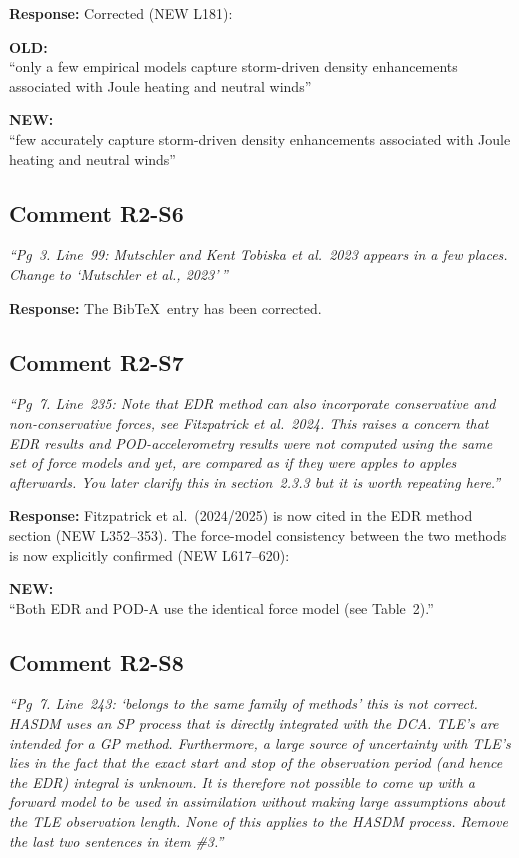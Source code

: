 \documentclass[11pt]{article}
\newcommand{\reviewercomment}[1]{%
  \medskip
  \noindent\textit{\color{reviewblue}#1}%
  \medskip
}
\newcommand{\oldtext}[1]{%
  \smallskip
  \noindent\hspace{1em}\begin{minipage}{0.92\textwidth}%
  \color{quotegray}\textbf{OLD:}\\[2pt]``#1''%
  \end{minipage}%
  \smallskip
}
\newcommand{\newtext}[1]{%
  \smallskip
  \noindent\hspace{1em}\begin{minipage}{0.92\textwidth}%
  \color{quotegreen}\textbf{NEW:}\\[2pt]``#1''%
  \end{minipage}%
  \smallskip
}
\begin{document}
\textbf{Response:}
Corrected (NEW L181):

\oldtext{only a few empirical models capture storm-driven density enhancements associated with Joule heating and neutral winds}

\newtext{few accurately capture storm-driven density enhancements associated with Joule heating and neutral winds}


\subsection{Comment R2-S6}

\reviewercomment{%
``Pg~3. Line~99: Mutschler and Kent Tobiska et al.\ 2023 appears in a few places. Change to `Mutschler et al., 2023'\,''}

\textbf{Response:}
The Bib\TeX\ entry has been corrected.


\subsection{Comment R2-S7}

\reviewercomment{%
``Pg~7. Line~235: Note that EDR method can also incorporate conservative and non-conservative forces, see Fitzpatrick et al.\ 2024. This raises a concern that EDR results and POD-accelerometry results were not computed using the same set of force models and yet, are compared as if they were apples to apples afterwards. You later clarify this in section~2.3.3 but it is worth repeating here.''}

\textbf{Response:}
Fitzpatrick et al.\ (2024/2025) is now cited in the EDR method section (NEW L352--353). The force-model consistency between the two methods is now explicitly confirmed (NEW L617--620):

\newtext{Both EDR and POD-A use the identical force model (see Table~2).}

\subsection{Comment R2-S8}

\reviewercomment{%
``Pg~7. Line~243: `belongs to the same family of methods' this is not correct. HASDM uses an SP process that is directly integrated with the DCA. TLE's are intended for a GP method. Furthermore, a large source of uncertainty with TLE's lies in the fact that the exact start and stop of the observation period (and hence the EDR) integral is unknown. It is therefore not possible to come up with a forward model to be used in assimilation without making large assumptions about the TLE observation length. None of this applies to the HASDM process. Remove the last two sentences in item \#3.''}
\end{document}
